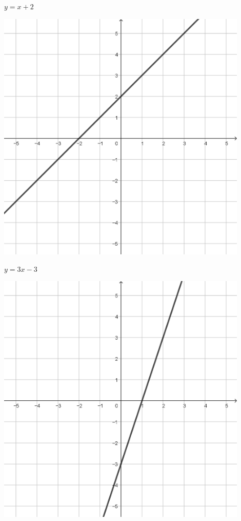 \documentclass{oblivoir}
\begin{document}
%
\footnotesize
\begin{minipage}{0.45\textwidth}
\par\medskip
\begin{minipage}{0.45\textwidth}\centering
\(y=x+2\)
\par\bigskip\includegraphics[width=0.9\textwidth]{L01}
\end{minipage}
\begin{minipage}{0.45\textwidth}\centering
\(y=3x-3\)
\par\bigskip\includegraphics[width=0.9\textwidth]{L02}

\end{minipage}
\end{minipage}
\end{document}
